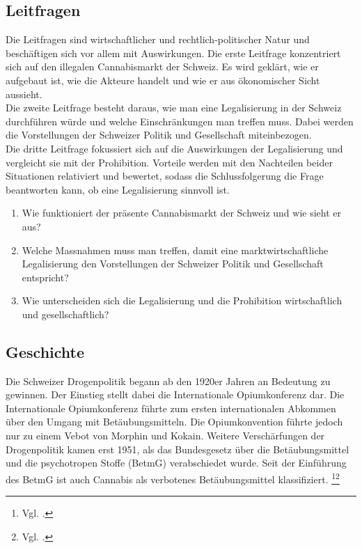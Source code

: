 \documentclass[../main.tex]{subfiles}
\begin{document}
	 \subsection{Leitfragen}
	 Die Leitfragen sind wirtschaftlicher und rechtlich-politischer Natur und beschäftigen sich vor allem mit Auswirkungen.
	 Die erste Leitfrage konzentriert sich auf den illegalen Cannabismarkt der Schweiz.
	 Es wird geklärt, wie er aufgebaut ist, wie die Akteure handelt und wie er aus ökonomischer Sicht aussieht.\\
	 
	 \noindent
	 Die zweite Leitfrage besteht daraus, wie man eine Legalisierung in der Schweiz durchführen würde und welche Einschränkungen man treffen muss.
	 Dabei werden die Vorstellungen der Schweizer Politik und Gesellschaft miteinbezogen.\\
	 
	 \noindent
	 Die dritte Leitfrage fokussiert sich auf die Auswirkungen der Legalisierung und vergleicht sie mit der Prohibition. 
	 Vorteile werden mit den Nachteilen beider Situationen relativiert und bewertet, sodass die Schlussfolgerung die Frage beantworten kann, ob eine Legalisierung sinnvoll ist.

	 
	 \begin{enumerate}
	 	\item Wie funktioniert der präsente Cannabismarkt der Schweiz und wie sieht er aus?
	 	 
	 	\item Welche Massnahmen muss man treffen, damit eine marktwirtschaftliche Legalisierung den Vorstellungen der Schweizer Politik und Gesellschaft entspricht?
	 
	 	\item Wie unterscheiden sich die Legalisierung und die Prohibition wirtschaftlich und gesellschaftlich?
	 \end{enumerate}
	
	 
	 \subsection{Geschichte}
	 Die Schweizer Drogenpolitik begann ab den 1920er Jahren an Bedeutung zu gewinnen. 
	 Der Einstieg stellt dabei die Internationale Opiumkonferenz dar. 
	 Die Internationale Opiumkonferenz führte zum ersten internationalen Abkommen über den Umgang mit Betäubungsmitteln. 
	 Die Opiumkonvention führte jedoch nur zu einem Vebot von Morphin und Kokain. 
	 Weitere Verschärfungen der Drogenpolitik kamen erst 1951, als das Bundesgesetz über die Betäubungsmittel und die psychotropen Stoffe (BetmG) verabschiedet wurde.
	 Seit der Einführung des BetmG ist auch Cannabis als verbotenes Betäubungsmittel klassifiziert.%
	 \footnote{Vgl. \cite{brassel}.}\footnote{Vgl. \cite{admin-01}.}\\
	 	 
\end{document}
